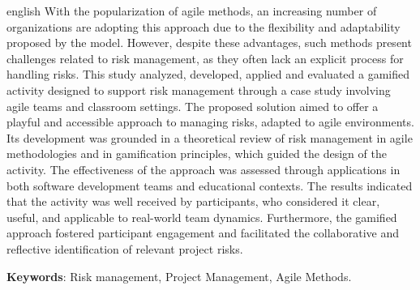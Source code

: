 \documentclass[
	12pt,
	openright,
	twoside,
	a4paper,
	english,
	brazil
	]{abntex2}
\begin{document}
\begin{resumo}[Abstract]
  \begin{otherlanguage*}{english}
    With the popularization of agile methods, an increasing number of organizations are adopting this approach due to the flexibility and adaptability proposed by the model. However, despite these advantages, such methods present challenges related to risk management, as they often lack an explicit process for handling risks.
    This study analyzed, developed, applied and evaluated a gamified activity designed to support risk management through a case study involving agile teams and classroom settings. The proposed solution aimed to offer a playful and accessible approach to managing risks, adapted to agile environments.
    Its development was grounded in a theoretical review of risk management in agile methodologies and in gamification principles, which guided the design of the activity. The effectiveness of the approach was assessed through applications in both software development teams and educational contexts.
    The results indicated that the activity was well received by participants, who considered it clear, useful, and applicable to real-world team dynamics. Furthermore, the gamified approach fostered participant engagement and facilitated the collaborative and reflective identification of relevant project risks.
    \vspace{\onelineskip}

    \noindent\textbf{Keywords}: Risk management, Project Management, Agile Methods.
  \end{otherlanguage*}
\end{resumo}


\listoffigures*
\cleardoublepage




\listoftables*
\cleardoublepage

\end{document}
